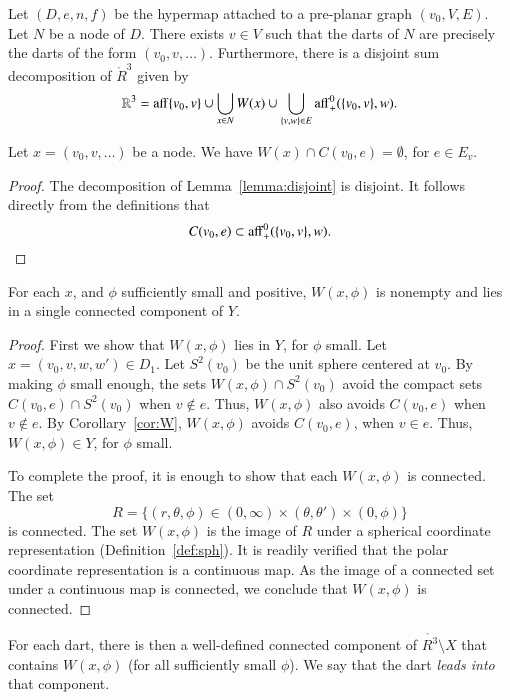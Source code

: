 \begin{lemma}  
Let $(D,e,n,f)$ be the hypermap attached to a 
pre-planar graph $(v_0,V,E)$.
Let $N$ be a node of $D$.  There exists $v\in V$
such that the darts of $N$ are precisely
the darts of the form $(v_0,v,\ldots)$.  Furthermore, there is a 
disjoint sum decomposition of $\ring{R}^3$ given by
  $$
  \mathbb{R}^3 = 
  {\operatorname{aff}}\{v_0,v\} \cup
  \bigcup_{x\in N} W(x)  \cup 
  \bigcup_{\{v,w\}\in E} {\operatorname{aff}}_+^0(\{v_0,v\},w).
  $$
\end{lemma}

\begin{corollary}  
Let $x = (v_0,v,\ldots)$ be a node.
We have $W(x)\cap C(v_0,e)=\emptyset$, for $e\in E_v$.
\end{corollary}

\begin{proof} The decomposition of Lemma~\ref{lemma:disjoint} is
disjoint.  It follows directly from the definitions that
   $$C(v_0,e)\subset {\operatorname{aff}}_+^0(\{v_0,v\},w).$$
\end{proof}

\begin{lemma} For each $x$, and $\phi$ sufficiently small and positive,
$W(x,\phi)$ is nonempty and lies in a single connected
component of $Y$.
\end{lemma}

\begin{proof}  First we show that $W(x,\phi)$ lies in $Y$,
for $\phi$ small.  Let $x=(v_0,v,w,w')\in D_1$.  
Let $S^2(v_0)$ be the unit sphere centered at $v_0$.
By making $\phi$ small enough,
the sets $W(x,\phi)\cap S^2(v_0)$
avoid the compact sets $C(v_0,e)\cap S^2(v_0)$ when $v\not\in e$.
Thus, $W(x,\phi)$ also avoids $C(v_0,e)$ when $v\not\in e$.
By Corollary~\ref{cor:W}, $W(x,\phi)$ avoids $C(v_0,e)$, when $v\in e$.
Thus, $W(x,\phi)\in Y$, for $\phi$ small.

To complete the proof, it is enough to show that each $W(x,\phi)$ is
connected.  
The  set
   $$
   R=\{(r,\theta,\phi) \in (0,\infty) \times (\theta,\theta') \times (0,\phi)\}
   $$
is connected.
The set $W(x,\phi)$  is the image of $R$
under a spherical coordinate representation (Definition~\ref{def:sph}).
It is readily verified that the polar coordinate representation is
a continuous map. As the image of a connected set under a continuous map
is connected, we conclude that $W(x,\phi)$ is connected.
\end{proof}

\begin{definition} For each dart, there is then a well-defined connected
component of $\ring{R^3}\setminus X$ that contains $W(x,\phi)$ (for all
sufficiently small $\phi$). We say that the dart {\it leads into}
that component.
\end{definition}

